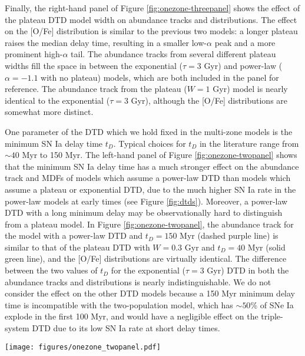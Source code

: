 \documentclass[twocolumn,twocolappendix,linenumbers,trackchanges]{aastex631}
\begin{document}
Finally, the right-hand panel of Figure \ref{fig:onezone-threepanel} shows the effect of the plateau DTD model width on abundance tracks and distributions. The effect on the [O/Fe] distribution is similar to the previous two models: a longer plateau raises the median delay time, resulting in a smaller low-$\alpha$ peak and a more prominent high-$\alpha$ tail. The abundance tracks from several different plateau widths fill the space in between the exponential ($\tau=3$ Gyr) and power-law ($\alpha=-1.1$ with no plateau) models, which are both included in the panel for reference. The abundance track from the plateau ($W=1$ Gyr) model is nearly identical to the exponential ($\tau=3$ Gyr), although the [O/Fe] distributions are somewhat more distinct.

One parameter of the DTD which we hold fixed in the multi-zone models is the minimum SN Ia delay time $t_D$. Typical choices for $t_D$ in the literature range from $\sim 40$ Myr to 150 Myr. The left-hand panel of Figure \ref{fig:onezone-twopanel} shows that the minimum SN Ia delay time has a much stronger effect on the abundance track and MDFs of models which assume a power-law DTD than models which assume a plateau or exponential DTD, due to the much higher SN Ia rate in the power-law models at early times (see Figure \ref{fig:dtds}). Moreover, a power-law DTD with a long minimum delay may be observationally hard to distinguish from a plateau model. In Figure \ref{fig:onezone-twopanel}, the abundance track for the model with a power-law DTD and $t_D=150$ Myr (dashed purple line) is similar to that of the plateau DTD with $W=0.3$ Gyr and $t_D=40$ Myr (solid green line), and the [O/Fe] distributions are virtually identical. The difference between the two values of $t_D$ for the exponential ($\tau=3$ Gyr) DTD in both the abundance tracks and distributions is nearly indistinguishable. We do not consider the effect on the other DTD models because a 150 Myr minimum delay time is incompatible with the two-population model, which has $\sim 50$\% of SNe Ia explode in the first 100 Myr, and would have a negligible effect on the triple-system DTD due to its low SN Ia rate at short delay times.

\begin{figure*}
    \centering
    \texttt{[image: figures/onezone\_twopanel.pdf]}
    \caption{\textit{Left:} Comparison of one-zone models with minimum SN Ia delay times of 40 Myr (solid curves) and 150 Myr (dashed curves) for two DTDs: a power-law with $\alpha=-1.1$ (blue curves), and an exponential with $\tau=1.5$ Gyr (purple curves). The layout is similar to the plots in Figure \ref{fig:onezone-threepanel}. For clarity, we use a mass-loading factor $\eta=1$ for the exponential DTD run.
    \textit{Right:} Comparison of one-zone models which assume all five functional forms for the DTD in this paper: triple-system (green), plateau with $W=1$ Gyr (cyan), exponential with $\tau=1.5$ Gyr (purple), power-law with $\alpha=-1.1$ (blue), and two-population (pink). A minimum SN Ia delay time of 40 Myr is assumed for all models.}
    \label{fig:onezone-twopanel}
\end{figure*}
\end{document}
